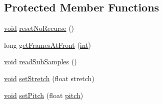 \subsection*{Protected Member Functions}
\begin{DoxyCompactItemize}
\item 
\hyperlink{sound_8c_ae35f5844602719cf66324f4de2a658b3}{void} \hyperlink{class__sbsms___1_1_sub_band_a1a9337b6a88d7d9503eeda19c54f7112}{reset\+No\+Recurse} ()
\item 
long \hyperlink{class__sbsms___1_1_sub_band_a768997d2ae62d86a3244c6969709e64e}{get\+Frames\+At\+Front} (\hyperlink{xmltok_8h_a5a0d4a5641ce434f1d23533f2b2e6653}{int})
\item 
\hyperlink{sound_8c_ae35f5844602719cf66324f4de2a658b3}{void} \hyperlink{class__sbsms___1_1_sub_band_a4617b62b18ece2c54ee7de2c7e2ff8c1}{read\+Sub\+Samples} ()
\item 
\hyperlink{sound_8c_ae35f5844602719cf66324f4de2a658b3}{void} \hyperlink{class__sbsms___1_1_sub_band_ae81b56e5718224afc9c2893e7ecd8ea9}{set\+Stretch} (float stretch)
\item 
\hyperlink{sound_8c_ae35f5844602719cf66324f4de2a658b3}{void} \hyperlink{class__sbsms___1_1_sub_band_a653b2764a85fe1acd4050bdfb7a144b8}{set\+Pitch} (float \hyperlink{seqread_8c_a7f083f7b76ea4d09b2820211a2b0d04e}{pitch})
\end{DoxyCompactItemize}
